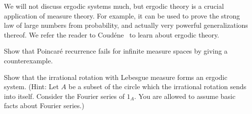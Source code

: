 \begin{subsec}
We will not discuss ergodic systems much, but ergodic theory is a crucial application of measure theory.
For example, it can be used to prove the strong law of large numbers from probability, and actually very powerful generalizations thereof.
We refer the reader to Coud\'ene~\cite{coudène2016ergodic} to learn about ergodic theory.
\end{subsec}

\begin{exercise}
Show that Poincar\'e recurrence fails for infinite measure spaces by giving a counterexample.
\end{exercise}

\begin{exercise}\label{irrational rotation exercise}
Show that the irrational rotation with Lebesgue measure forms an ergodic system.
(Hint: Let $A$ be a subset of the circle which the irrational rotation sends into itself. Consider the Fourier series of $1_{A}$. You are allowed to assume basic facts about Fourier series.)
\end{exercise}
